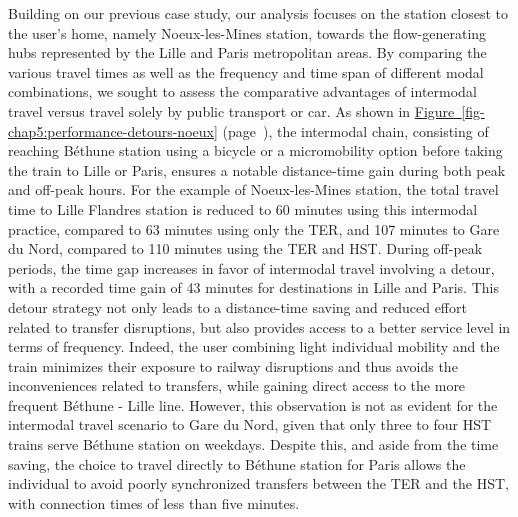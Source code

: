 \begin{refsegment}
Building on our previous case study, our analysis focuses on the station closest to the user's home, namely Noeux-les-Mines station, towards the flow-generating hubs represented by the Lille and Paris metropolitan areas. By comparing the various travel times as well as the frequency and time span of different modal combinations, we sought to assess the comparative advantages of intermodal travel versus travel solely by public transport or car. As shown in \hyperref[fig-chap5:performance-detours-noeux]{Figure~\ref{fig-chap5:performance-detours-noeux}} (page~\pageref{fig-chap5:performance-detours-noeux}), the intermodal chain, consisting of reaching Béthune station using a bicycle or a micromobility option before taking the train to Lille or Paris, ensures a notable distance-time gain during both peak and off-peak hours. For the example of Noeux-les-Mines station, the total travel time to Lille Flandres station is reduced to 60 minutes using this intermodal practice, compared to 63 minutes using only the \acrshort{TER}, and 107 minutes to Gare du Nord, compared to 110 minutes using the \acrshort{TER} and \acrshort{HST}. During off-peak periods, the time gap increases in favor of intermodal travel involving a detour, with a recorded time gain of 43 minutes for destinations in Lille and Paris. This detour strategy not only leads to a distance-time saving and reduced effort related to transfer disruptions, but also provides access to a better service level in terms of frequency. Indeed, the user combining light individual mobility and the train minimizes their exposure to railway disruptions and thus avoids the inconveniences related to transfers, while gaining direct access to the more frequent Béthune - Lille line. However, this observation is not as evident for the intermodal travel scenario to Gare du Nord, given that only three to four \acrshort{HST} trains serve Béthune station on weekdays. Despite this, and aside from the time saving, the choice to travel directly to Béthune station for Paris allows the individual to avoid poorly synchronized transfers between the \acrshort{TER} and the \acrshort{HST}, with connection times of less than five minutes.%


\end{refsegment}
